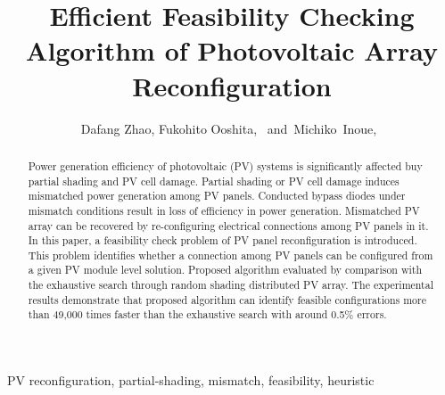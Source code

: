 \documentclass[journal]{IEEEtran}
\begin{document}
\title{Efficient Feasibility Checking Algorithm of Photovoltaic Array Reconfiguration}

\author{Dafang Zhao,
        Fukohito Ooshita,~
        and~Michiko~Inoue,~}%


% 


\maketitle

\begin{abstract}
  Power generation efficiency of photovoltaic (PV) systems is significantly affected buy partial shading and PV cell damage.
  Partial shading or PV cell damage induces mismatched power generation among PV panels.
  Conducted bypass diodes under mismatch conditions result in loss of efficiency in power generation.
  Mismatched PV array can be recovered by re-configuring electrical connections among PV panels in it.
  In this paper, a feasibility check problem of PV panel reconfiguration is introduced.
  This problem identifies whether a connection among PV panels can be configured from a given PV module level solution.
  Proposed algorithm evaluated by comparison with the exhaustive search through random shading distributed PV array.
  The experimental results demonstrate that proposed algorithm can identify feasible configurations more than 49,000 times faster than the exhaustive search with around 0.5\% errors.
\end{abstract}

\begin{IEEEkeywords}
PV reconfiguration, partial-shading, mismatch, feasibility, heuristic
\end{IEEEkeywords}
\end{document}
